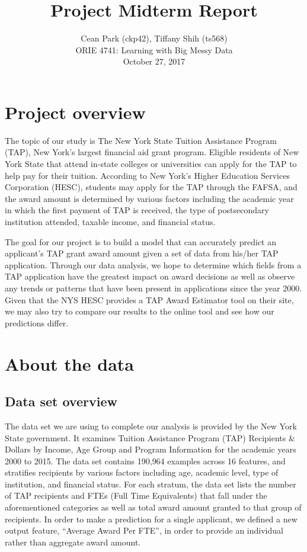 \documentclass[11pt, fleqn]{article}
\begin{document}
\title{\vspace{-2cm}Project Midterm Report}
\author{Cean Park (ckp42), Tiffany Shih (ts568)\\
ORIE 4741: Learning with Big Messy Data \\ October 27, 2017}
\date{}

\maketitle

\vspace{-1cm}
\section{Project overview} 
The topic of our study is The New York State Tuition Assistance Program (TAP), New York's largest financial aid grant program. Eligible residents of New York State that attend in-state colleges or universities can apply for the TAP to help pay for their tuition. According to New York’s Higher Education Services Corporation (HESC), students may apply for the TAP through the FAFSA, and the award amount is determined by various factors including the academic year in which the first payment of TAP is received, the type of postsecondary institution attended, taxable income, and financial status. 

The goal for our project is to build a model that can accurately predict an applicant's TAP grant award amount given a set of data from his/her TAP application. Through our data analysis, we hope to determine which fields from a TAP application have the greatest impact on award decisions as well as observe any trends or patterns that have been present in applications since the year 2000. Given that the NYS HESC provides a TAP Award Estimator tool on their site, we may also try to compare our results to the online tool and see how our predictions differ.

\section{About the data}

\subsection{Data set overview}
The data set we are using to complete our analysis is provided by the New York State government. It examines Tuition Assistance Program (TAP) Recipients \& Dollars by Income, Age Group and Program Information for the academic years 2000 to 2015. The data set contains 190,964 examples across 16 features, and stratifies recipients by various factors including age, academic level, type of institution, and financial status. For each stratum, the data set lists the number of TAP recipients and FTEs (Full Time Equivalents) that fall under the aforementioned categories as well as total award amount granted to that group of recipients. In order to make a prediction for a single applicant, we defined a new output feature, ``Average Award Per FTE'', in order to provide an individual rather than aggregate award amount.
\end{document}
